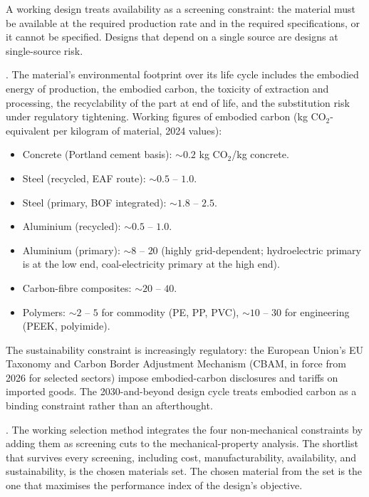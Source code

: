 A working design treats availability as a screening constraint: the
material must be available at the required production rate and in the
required specifications, or it cannot be specified. Designs that
depend on a single source are designs at single-source risk.

. The material's environmental footprint over
its life cycle includes the embodied energy of production, the
embodied carbon, the toxicity of extraction and processing, the
recyclability of the part at end of life, and the substitution risk
under regulatory tightening. Working figures of embodied carbon (kg
CO$_2$-equivalent per kilogram of material, 2024 values):

\begin{itemize}[leftmargin=*]
\item Concrete (Portland cement basis): $\sim 0.2$ kg CO$_2$/kg
  concrete.
\item Steel (recycled, EAF route): $\sim 0.5$ -- $1.0$.
\item Steel (primary, BOF integrated): $\sim 1.8$ -- $2.5$.
\item Aluminium (recycled): $\sim 0.5$ -- $1.0$.
\item Aluminium (primary): $\sim 8$ -- $20$ (highly grid-dependent;
  hydroelectric primary is at the low end, coal-electricity primary
  at the high end).
\item Carbon-fibre composites: $\sim 20$ -- $40$.
\item Polymers: $\sim 2$ -- $5$ for commodity (PE, PP, PVC), $\sim 10$
  -- $30$ for engineering (PEEK, polyimide).
\end{itemize}

The sustainability constraint is increasingly regulatory: the European
Union's EU Taxonomy and Carbon Border Adjustment Mechanism (CBAM, in
force from 2026 for selected sectors) impose embodied-carbon
disclosures and tariffs on imported goods. The 2030-and-beyond design
cycle treats embodied carbon as a binding constraint rather than an
afterthought.

. The working selection method
integrates the four non-mechanical constraints by adding them as
screening cuts to the mechanical-property analysis. The shortlist that
survives every screening, including cost, manufacturability,
availability, and sustainability, is the chosen materials set. The
chosen material from the set is the one that maximises the
performance index of the design's objective.


